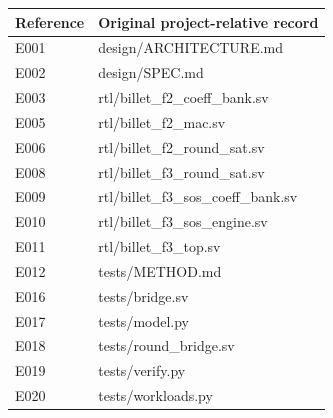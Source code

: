 \documentclass[11pt,a4paper]{article}
\begin{document}
{\small\renewcommand{\arraystretch}{1.18}\begin{longtable}{@{}L{0.12\textwidth}|L{0.82\textwidth}@{}}\toprule

\textbf{Reference} & \textbf{Original project-relative record}\\\midrule\endhead

E001 & design/\allowbreak{}ARCHITECTURE.md\\[2pt]\hline

E002 & design/\allowbreak{}SPEC.md\\[2pt]\hline

E003 & rtl/\allowbreak{}billet\_\allowbreak{}f2\_\allowbreak{}coeff\_\allowbreak{}bank.sv\\[2pt]\hline

E005 & rtl/\allowbreak{}billet\_\allowbreak{}f2\_\allowbreak{}mac.sv\\[2pt]\hline

E006 & rtl/\allowbreak{}billet\_\allowbreak{}f2\_\allowbreak{}round\_\allowbreak{}sat.sv\\[2pt]\hline

E008 & rtl/\allowbreak{}billet\_\allowbreak{}f3\_\allowbreak{}round\_\allowbreak{}sat.sv\\[2pt]\hline

E009 & rtl/\allowbreak{}billet\_\allowbreak{}f3\_\allowbreak{}sos\_\allowbreak{}coeff\_\allowbreak{}bank.sv\\[2pt]\hline

E010 & rtl/\allowbreak{}billet\_\allowbreak{}f3\_\allowbreak{}sos\_\allowbreak{}engine.sv\\[2pt]\hline

E011 & rtl/\allowbreak{}billet\_\allowbreak{}f3\_\allowbreak{}top.sv\\[2pt]\hline

E012 & tests/\allowbreak{}METHOD.md\\[2pt]\hline

E016 & tests/\allowbreak{}bridge.sv\\[2pt]\hline

E017 & tests/\allowbreak{}model.py\\[2pt]\hline

E018 & tests/\allowbreak{}round\_\allowbreak{}bridge.sv\\[2pt]\hline

E019 & tests/\allowbreak{}verify.py\\[2pt]\hline

E020 & tests/\allowbreak{}workloads.py\\[2pt]\hline


\end{longtable}}
\end{document}
